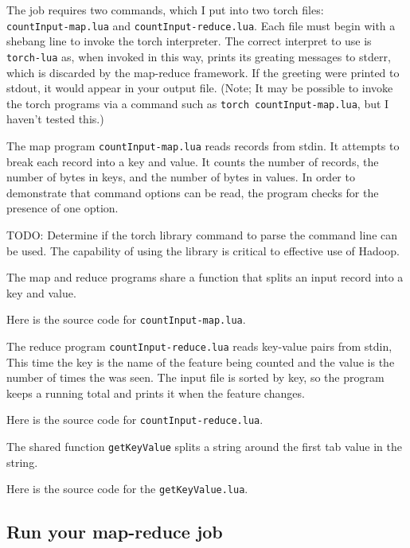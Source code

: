\documentclass{article}
\let\code\texttt %
\begin{document}
{The job requires two commands, which I put into two torch files:\\
\code{countInput-map.lua} and \code{countInput-reduce.lua}. Each file
must begin with a shebang line to invoke the torch interpreter. The
correct interpret to use is \code{torch-lua} as, when invoked in this
way, prints its greating messages to stderr, which is discarded by the
map-reduce framework. If the greeting were printed to stdout, it would
appear in your output file. (Note; It may be possible to invoke the
torch programs via a command such as \code{torch countInput-map.lua},
but I haven't tested this.)

The map program \code{countInput-map.lua} reads records from stdin. It
attempts to break each record into a key and value. It counts the number
of records, the number of bytes in keys, and the number of bytes in
values. In order to demonstrate that command options can be read, the
program checks for the presence of one option.

TODO: Determine if the torch library command to parse the command line
can be used. The capability of using the library is critical to
effective use of Hadoop.

The map and reduce programs share a function that splits an input record
into a key and value.

Here is the source code for \code{countInput-map.lua}.



The reduce program \code{countInput-reduce.lua} reads key-value pairs
from stdin, This time the key is the name of the feature being counted
and the value is the number of times the was seen. The input file is
sorted by key, so the program keeps a running total and prints it when
the feature changes.

Here is the source code for \code{countInput-reduce.lua}.



The shared function \code{getKeyValue} splits a string around the first
tab value in the string.

Here is the source code for the \code{getKeyValue.lua}.



\subsection{Run your map-reduce job}

}
\end{document}
